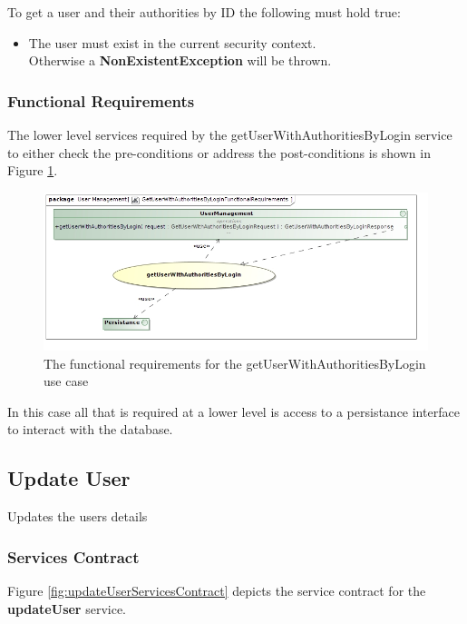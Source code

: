 To get a user and their authorities by ID the following must hold true:
\begin{itemize}
	\item The user must exist in the current security context.\\
	Otherwise a \textbf{NonExistentException} will be thrown.
\end{itemize}

\subsubsection{Functional Requirements}
The lower level services required by the getUserWithAuthoritiesByLogin service
to either check the pre-conditions or address the post-conditions is shown
in Figure \ref{getUserWithAuthoritiesByLoginFR}.

\begin{figure}[H]
	\begin{center}
		\includegraphics[scale=0.5]{../Diagrams and Charts/Users/GetUserWithAuthoritiesByLoginFunctionalRequirements.jpg}
		\caption{The functional requirements for the getUserWithAuthoritiesByLogin use case}
		\label{getUserWithAuthoritiesByLoginFR}
	\end{center}	
\end{figure}

In this case all that is required at a lower level is access to a persistance
interface to interact with the database.

\subsection{Update User}
Updates the users details

\subsubsection{Services Contract}
Figure \ref{fig:updateUserServicesContract} depicts the service
contract for the \textbf{updateUser} service.

